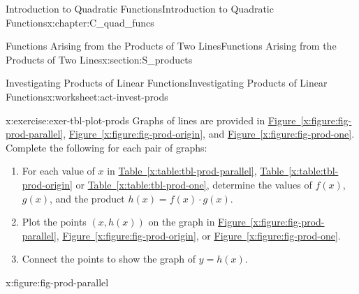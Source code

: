 \documentclass[oneside,10pt,]{book}
\newcommand{\xreffont}{\relax}
\numberwithin{equation}{chapter}
\begin{document}
\begin{chapterptx}{Introduction to Quadratic Functions}{}{Introduction to Quadratic Functions}{}{}{x:chapter:C_quad_funcs}
\begin{sectionptx}{Functions Arising from the Products of Two Lines}{}{Functions Arising from the Products of Two Lines}{}{}{x:section:S_products}
\begin{worksheet-subsection}{Investigating Products of Linear Functions}{}{Investigating Products of Linear Functions}{}{}{x:worksheet:act-invest-prods}
\begin{introduction}{}
\end{introduction}%
\begin{divisionexercise}{1}{}{}{x:exercise:exer-tbl-plot-prods}%
Graphs of lines are provided in \hyperref[x:figure:fig-prod-parallel]{Figure~{\xreffont\ref{x:figure:fig-prod-parallel}}}, \hyperref[x:figure:fig-prod-origin]{Figure~{\xreffont\ref{x:figure:fig-prod-origin}}}, and \hyperref[x:figure:fig-prod-one]{Figure~{\xreffont\ref{x:figure:fig-prod-one}}}. Complete the following for each pair of graphs:%
\begin{enumerate}[font=\bfseries,label=(\alph*),ref=\alph*]
\item{}For each value of \(x\) in \hyperref[x:table:tbl-prod-parallel]{Table~{\xreffont\ref{x:table:tbl-prod-parallel}}}, \hyperref[x:table:tbl-prod-origin]{Table~{\xreffont\ref{x:table:tbl-prod-origin}}} or \hyperref[x:table:tbl-prod-one]{Table~{\xreffont\ref{x:table:tbl-prod-one}}}, determine the values of \(f(x)\), \(g(x)\), and the product \(h(x) = f(x) \cdot g(x)\).%
\item{}Plot the points \((x, h(x))\) on the graph in \hyperref[x:figure:fig-prod-parallel]{Figure~{\xreffont\ref{x:figure:fig-prod-parallel}}}, \hyperref[x:figure:fig-prod-origin]{Figure~{\xreffont\ref{x:figure:fig-prod-origin}}}, or \hyperref[x:figure:fig-prod-one]{Figure~{\xreffont\ref{x:figure:fig-prod-one}}}.%
\item{}Connect the points to show the graph of \(y = h(x)\).%
\end{enumerate}
\begin{sidebyside}{3}{0}{0}{0}%
\begin{sbspanel}{0.333333333333333}%
\begin{figureptx}{}{x:figure:fig-prod-parallel}{}%

\end{figureptx}
\end{sbspanel}
\end{sidebyside}
\end{divisionexercise}
\end{worksheet-subsection}
\end{sectionptx}
\end{chapterptx}
\end{document}
